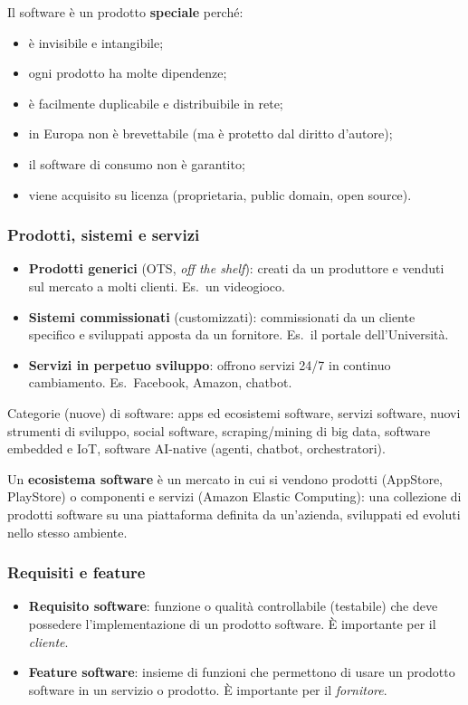 \documentclass[a4paper,12pt]{article}
\begin{document}
Il software è un prodotto \textbf{speciale} perché:
\begin{itemize}
  \item è invisibile e intangibile;
  \item ogni prodotto ha molte dipendenze;
  \item è facilmente duplicabile e distribuibile in rete;
  \item in Europa non è brevettabile (ma è protetto dal diritto d'autore);
  \item il software di consumo non è garantito;
  \item viene acquisito su licenza (proprietaria, public domain, open source).
\end{itemize}

\subsubsection{Prodotti, sistemi e servizi}

\begin{itemize}
  \item \textbf{Prodotti generici} (OTS, \emph{off the shelf}): creati da un produttore
        e venduti sul mercato a molti clienti. Es.\ un videogioco.
  \item \textbf{Sistemi commissionati} (customizzati): commissionati da un cliente
        specifico e sviluppati apposta da un fornitore. Es.\ il portale dell'Università.
  \item \textbf{Servizi in perpetuo sviluppo}: offrono servizi 24/7 in continuo
        cambiamento. Es.\ Facebook, Amazon, chatbot.
\end{itemize}

Categorie (nuove) di software: apps ed ecosistemi software, servizi software, nuovi
strumenti di sviluppo, social software, scraping/mining di big data, software embedded
e IoT, software AI-native (agenti, chatbot, orchestratori).

Un \textbf{ecosistema software} è un mercato in cui si vendono prodotti (AppStore,
PlayStore) o componenti e servizi (Amazon Elastic Computing): una collezione di
prodotti software su una piattaforma definita da un'azienda, sviluppati ed evoluti
nello stesso ambiente.

\subsubsection{Requisiti e feature}

\begin{itemize}
  \item \textbf{Requisito software}: funzione o qualità controllabile (testabile) che
        deve possedere l'implementazione di un prodotto software. È importante per il
        \emph{cliente}.
  \item \textbf{Feature software}: insieme di funzioni che permettono di usare un
        prodotto software in un servizio o prodotto. È importante per il \emph{fornitore}.
\end{itemize}
\end{document}
